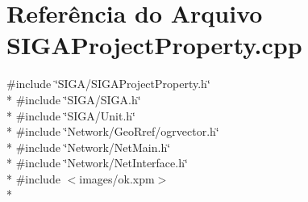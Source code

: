 \section{Referência do Arquivo S\+I\+G\+A\+Project\+Property.\+cpp}
\label{_s_i_g_a_project_property_8cpp}
{\ttfamily \#include \char`\"{}S\+I\+G\+A/\+S\+I\+G\+A\+Project\+Property.\+h\char`\"{}}\\*
{\ttfamily \#include \char`\"{}S\+I\+G\+A/\+S\+I\+G\+A.\+h\char`\"{}}\\*
{\ttfamily \#include \char`\"{}S\+I\+G\+A/\+Unit.\+h\char`\"{}}\\*
{\ttfamily \#include \char`\"{}Network/\+Geo\+Rref/ogrvector.\+h\char`\"{}}\\*
{\ttfamily \#include \char`\"{}Network/\+Net\+Main.\+h\char`\"{}}\\*
{\ttfamily \#include \char`\"{}Network/\+Net\+Interface.\+h\char`\"{}}\\*
{\ttfamily \#include $<$images/ok.\+xpm$>$}\\*
